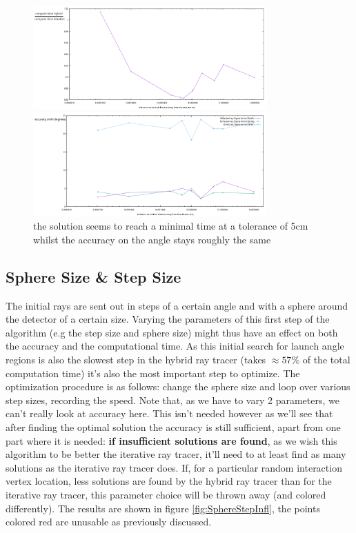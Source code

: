 \begin{figure}
	\centering
	\begin{minipage}{\textwidth}
		\includegraphics[width=0.8\textwidth]{figures/ZtolVsTime2.pdf}
	\end{minipage}
	\begin{minipage}{\textwidth}
		\includegraphics[width=0.8\textwidth]{figures/ZtolVsSigmaAZ.pdf}
	\end{minipage}
\caption{the solution seems to reach a minimal time at a tolerance of 5cm whilst the accuracy on the angle stays roughly the same}
\label{fig:ztolinfl2}
\end{figure}

\subsection{Sphere Size \& Step Size}
The initial rays are sent out in steps of a certain angle and with a sphere
around the detector of a certain size. Varying the parameters of this first
step of the algorithm (e.g the step size and sphere size) might thus have an
effect on both the accuracy and the computational time.  As this initial search
for launch angle regions is also the slowest step in the hybrid ray tracer (takes
$\approx 57\%$ of the total computation time)
it's also the most important step to optimize. The optimization procedure is as
follows: change the sphere size and loop over various step sizes, recording the
speed. Note that, as we have to vary 2 parameters, we can't really look at
accuracy here. This isn't needed however as we'll see that after finding the
optimal solution the accuracy is still sufficient, apart from one part where it is
needed: \textbf{if insufficient solutions are found}, as we wish this algorithm
to be better the iterative ray tracer, it'll need to at least find as many solutions
as the iterative ray tracer does.  If, for a particular random interaction
vertex location, less solutions are found by the hybrid ray tracer than for the
iterative ray tracer, this parameter choice will be thrown away (and colored
differently).  The results are shown in figure
\ref{fig:SphereStepInfl}, the points colored red are unusable as previously
discussed.

